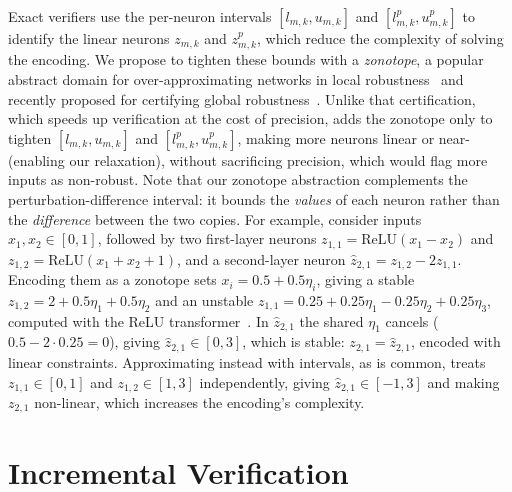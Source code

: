 Exact verifiers use the per-neuron intervals $[l_{m,k},u_{m,k}]$ and $[l^{p}_{m,k},u^{p}_{m,k}]$ to
identify the linear neurons $z_{m,k}$ and $z^{p}_{m,k}$, which reduce the complexity of solving the
encoding. We propose to tighten these bounds with a \emph{zonotope}, a popular abstract domain for over-approximating
networks in local robustness~\cite{gehr2018,singh2018fast,singh2019,mirman2018differentiable} and
recently proposed for certifying global robustness~\cite{athavale2026differential}. Unlike that certification, which speeds up verification at the cost of precision, \tool adds the
zonotope only to tighten $[l_{m,k},u_{m,k}]$ and $[l^{p}_{m,k},u^{p}_{m,k}]$, making more neurons linear or near-
(enabling our relaxation), without sacrificing precision, which would flag more
inputs as non-robust. Note that our zonotope abstraction complements the perturbation-difference interval: it bounds the
\emph{values} of each neuron rather than the \emph{difference} between the two copies.
For example, consider inputs $x_1, x_2 \in [0,1]$, followed by two first-layer neurons
$z_{1,1} = \mathrm{ReLU}(x_1 - x_2)$ and $z_{1,2} = \mathrm{ReLU}(x_1 + x_2 + 1)$, and a second-layer
neuron $\hat{z}_{2,1} = z_{1,2} - 2z_{1,1}$. Encoding them as a zonotope sets $x_i = 0.5 + 0.5\eta_i$, giving a stable
$z_{1,2} = 2 + 0.5\eta_1 + 0.5\eta_2$ and an unstable
$z_{1,1} = 0.25 + 0.25\eta_1 - 0.25\eta_2 + 0.25\eta_3$, computed with the ReLU transformer~\cite{singh2018fast}. In $\hat{z}_{2,1}$ the shared $\eta_1$ cancels
($0.5 - 2 \cdot 0.25 = 0$), giving $\hat{z}_{2,1} \in [0,3]$, which is stable: $z_{2,1} = \hat{z}_{2,1}$,
encoded with linear constraints. Approximating instead with intervals, as is common, treats
$z_{1,1} \in [0,1]$ and $z_{1,2} \in [1,3]$ independently, giving $\hat{z}_{2,1} \in [-1,3]$ and making
$z_{2,1}$ non-linear, which increases the encoding's complexity.

\section{Incremental Verification}
\label{sec:key-ideas-incremental}

